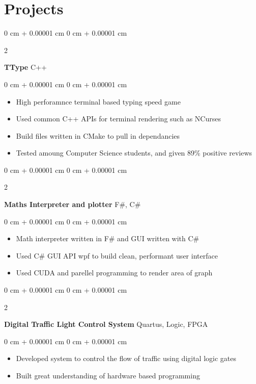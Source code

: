 \documentclass[10pt, letterpaper]{article}
\newenvironment{highlights}{
    \begin{itemize}[
        topsep=0.10 cm,
        parsep=0.10 cm,
        partopsep=0pt,
        itemsep=0pt,
        leftmargin=0 cm + 10pt
    ]
}{
    \end{itemize}
} %
\newenvironment{onecolentry}{
    \begin{adjustwidth}{
        0 cm + 0.00001 cm
    }{
        0 cm + 0.00001 cm
    }
}{
    \end{adjustwidth}
} %
\newenvironment{twocolentry}[2][]{
    \onecolentry
    \def\secondColumn{#2}
    \setcolumnwidth{\fill, 4.5 cm}
    \begin{paracol}{2}
}{
    \switchcolumn \raggedleft \secondColumn
    \end{paracol}
    \endonecolentry
} %
\begin{document}
    \section{Projects}

    \begin{twocolentry}{
        C++
    }
        \textbf{TType}\end{twocolentry}
    \vspace{0.10 cm}
    \begin{onecolentry}
        \begin{highlights}
            \item High perforamnce terminal based typing speed game
            \item Used common C++ APIs for terminal rendering such as NCurses
            \item Build files written in CMake to pull in dependancies
            \item Tested amoung Computer Science students, and given 89\% positive reviews
        \end{highlights}
    \end{onecolentry}
    \vspace{0.2 cm}
    \begin{twocolentry}{
        F\#, C\#
    }
        \textbf{Maths Interpreter and plotter}\end{twocolentry}
    \vspace{0.10 cm}
    \begin{onecolentry}
        \begin{highlights}
            \item Math interpreter written in F\# and GUI written with C\#
            \item Used C\# GUI API wpf to build clean, performant user interface
            \item Used CUDA and parellel programming to render area of graph
        \end{highlights}
    \end{onecolentry}

    \vspace{0.2 cm}

    \begin{twocolentry}{
        Quartus, Logic, FPGA
    }
        \textbf{Digital Traffic Light Control System}\end{twocolentry}
    \vspace{0.10 cm}
    \begin{onecolentry}
        \begin{highlights}
            \item Developed system to control the flow of traffic using digital logic gates
            \item Built great understanding of hardware based programming
        \end{highlights}
    \end{onecolentry}
\end{document}
